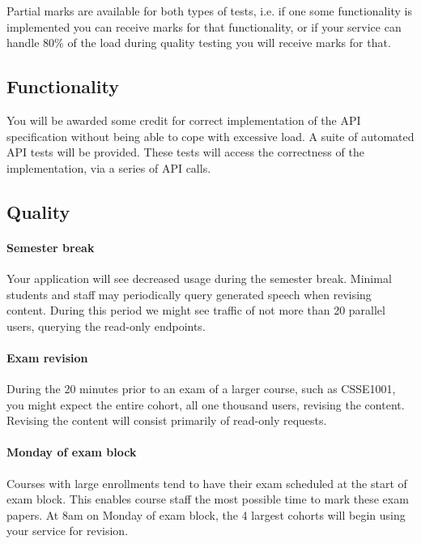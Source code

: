 \documentclass{csse4400}
\begin{document}
Partial marks are available for both types of tests,
i.e. if one some functionality is implemented you can receive marks for that functionality,
or if your service can handle 80\% of the load during quality testing you will receive marks for that.

\subsection{Functionality}
You will be awarded some credit for correct implementation of the API specification without being able to cope with excessive load.
A suite of automated API tests will be provided.
These tests will access the correctness of the implementation,
via a series of API calls.

\subsection{Quality}

\paragraph{Semester break}
Your application will see decreased usage during the semester break.
Minimal students and staff may periodically query generated speech when revising content.
During this period we might see traffic of not more than 20 parallel users,
querying the read-only endpoints.


\paragraph{Exam revision}
During the 20 minutes prior to an exam of a larger course, such as CSSE1001,
you might expect the entire cohort, all one thousand users,
revising the content.
Revising the content will consist primarily of read-only requests.

\paragraph{Monday of exam block}
Courses with large enrollments tend to have their exam scheduled at the start of exam block.
This enables course staff the most possible time to mark these exam papers.
At 8am on Monday of exam block,
the 4 largest cohorts will begin using your service for revision.
\end{document}
